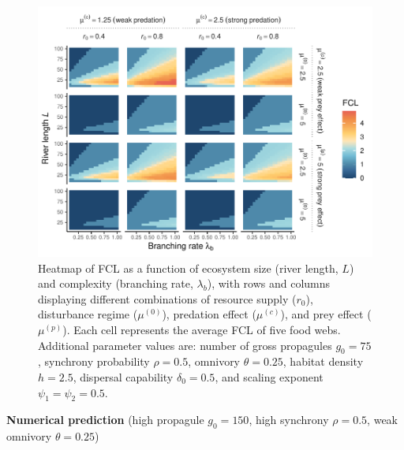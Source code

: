\begin{figure}
\centering
\includegraphics{../data_fmt/fig_rho05_g75_theta025.pdf}
\caption{Heatmap of FCL as a function of ecosystem size (river length,
\(L\)) and complexity (branching rate, \(\lambda_b\)), with rows and
columns displaying different combinations of resource supply (\(r_0\)),
disturbance regime (\(\mu^{(0)}\)), predation effect (\(\mu^{(c)}\)),
and prey effect (\(\mu^{(p)}\)). Each cell represents the average FCL of
five food webs. Additional parameter values are: number of gross
propagules \(g_0=75\), synchrony probability \(\rho=0.5\), omnivory
\(\theta=0.25\), habitat density \(h=2.5\), dispersal capability
\(\delta_0=0.5\), and scaling exponent \(\psi_1=\psi_2=0.5\).}
\end{figure}

\newpage

\textbf{Numerical prediction} (high propagule \(g_0 = 150\), high
synchrony \(\rho = 0.5\), weak omnivory \(\theta = 0.25\))

